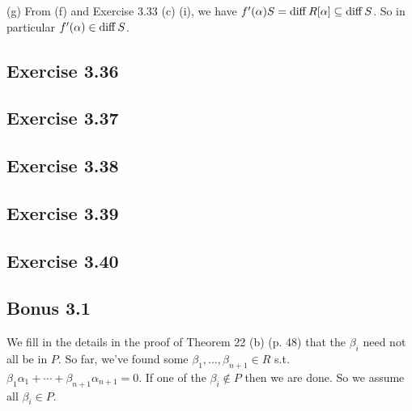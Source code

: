 \documentclass[../Marcus.tex]{subfiles}
\begin{document}
(g) From (f) and Exercise 3.33 (c) (i), we have $f'(\alpha)S = \operatorname{diff} R[\alpha] \subseteq \operatorname{diff} S$. So in particular $f'(\alpha) \in \operatorname{diff} S$.

\subsection*{Exercise 3.36}

\begin{comment}
(a) It's sufficient to check that $\alpha_1,\ldots,\alpha_n$ are linearly independent over $K$. If not, then there exist $c_1,\ldots,c_n \in K$ not all zero s.t. $\sum c_i\alpha_i = 0$. By Exercise 2.25, we take $0 \neq m\in\ZZ$ s.t. $mc_i\in R$ for all $i$. Then $\sum mc_i\alpha_i = 0$. Since $\alpha_1,\ldots,\alpha_n$ are linearly independent mod $P$, so by considering mod $PS$ we have $mc_i \in P$ for all $i$.

Now, with the notation as in the Lemma of Theorem 22 (b) (p. 48), we set $A=P$ and $B=(mc_1,\ldots,mc_n) \neq 0$. Then there exists $\gamma\in K$ s.t. $\gamma B\subset R$ and $\gamma B\not\subset A=P$. So we have all $\gamma mc_i \in R$ but there's some $\gamma mc_{i_0} \notin P$. But by considering the equation $\sum \gamma mc_i\alpha_i = 0$ mod $PS$, we have $\gamma mc_i \in P$ for all $i$, a contradiction.
\end{comment}

\subsection*{Exercise 3.37}

\subsection*{Exercise 3.38}

\subsection*{Exercise 3.39}

\subsection*{Exercise 3.40}

\subsection*{Bonus 3.1}

We fill in the details in the proof of Theorem 22 (b) (p. 48) that the $\beta_i$ need not all be in $P$. So far, we've found some $\beta_1,\ldots,\beta_{n+1}\in R$ s.t. $\beta_1\alpha_1+\cdots+\beta_{n+1}\alpha_{n+1}=0$. If one of the $\beta_i\notin P$ then we are done. So we assume all $\beta_i\in P$. 
\end{document}
